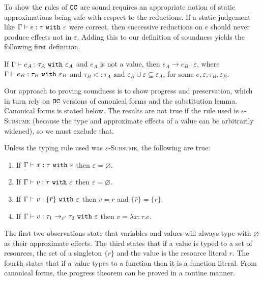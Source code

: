 To show the rules of $\mathtt{OC}$ are sound requires an appropriate notion of static approximations being safe with respect to the reductions. If a static judgement like $\Gamma \vdash e: \tau~\mathtt{with}~ \varepsilon$ were correct, then successive reductions on $e$ should never produce effects not in $\varepsilon$. Adding this to our definition of soundness yields the following first definition.


\begin{theorem}
If $ \Gamma \vdash  e_A:  \tau_A~\mathtt{with}~ \varepsilon_A$ and $ e_A$ is not a value, then $e_A \longrightarrow e_B~|~\varepsilon$, where $ \Gamma \vdash e_B:  \tau_B~\mathtt{with}~ \varepsilon_B$ and $ \tau_B <:  \tau_A$ and $\varepsilon_B \cup \varepsilon \subseteq \varepsilon_A$, for some $e, \varepsilon, \tau_B, \varepsilon_B$.
\end{theorem}

Our approach to proving soundness is to show progress and preservation, which in turn rely on $\mathtt{OC}$ versions of canonical forms and the substitution lemma. Canonical forms is stated below. The results are not true if the rule used is \textsc{$\varepsilon$-Subsume} (because the type and approximate effects of a value can be arbitrarily widened), so we must exclude that.

\begin{lemma}
Unless the typing rule used was \textsc{$\varepsilon$-Subsume}, the following are true:
\begin{enumerate}
	\item If $\Gamma \vdash x: \tau~\mathtt{with}~ \varepsilon$ then $\varepsilon = \varnothing$.
	\item If $ \Gamma \vdash  v:  \tau~\mathtt{with}~ \varepsilon$ then $\varepsilon = \varnothing$.
	\item If $ \Gamma \vdash v: \{ \bar r \}~\mathtt{with}~ \varepsilon$ then $v = r$ and $\{ \bar r \} = \{ r \}$.
	\item If $\Gamma \vdash v: \tau_1 \rightarrow_{\varepsilon'} \tau_2~\mathtt{with}~ \varepsilon$ then $v = \lambda x:\tau. e$.
\end{enumerate}
\end{lemma}

The first two observations state that variables and values will always type with $\varnothing$ as their approximate effects. The third states that if a value is typed to a set of resources, the set of a singleton $\{ r \}$ and the value is the resource literal $r$. The fourth states that if a value types to a function then it is a function literal. From canonical forms, the progress theorem can be proved in a routine manner.


